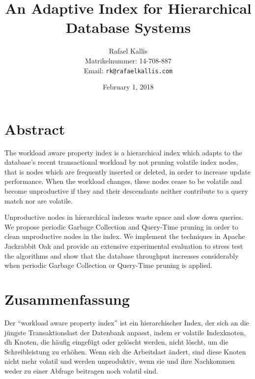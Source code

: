 \documentclass[abstracton,12pt]{scrartcl}
\title{An Adaptive Index for Hierarchical Database Systems}
\author{
    Rafael Kallis\\[-5pt]
    \scriptsize Matrikelnummer: 14-708-887\\[-5pt]
    \scriptsize Email: \texttt{rk@rafaelkallis.com}
}
\date{\vspace*{2cm}February 1, 2018}
\theoremstyle{definition}
\begin{document}
\maketitle
\thispagestyle{empty}


\newpage
\thispagestyle{empty}
\vspace*{7cm}

\section*{Abstract}

The workload aware property index is a hierarchical index which adapts to the
database's recent transactional workload by not pruning volatile index nodes,
that is nodes which are frequently inserted or deleted, in order to increase
update performance. When the workload changes, these nodes cease to be volatile
and become unproductive if they and their descendants neither contribute to a
query match nor are volatile.

Unproductive nodes in hierarchical indexes waste space and slow down queries.
We propose periodic Garbage Collection and Query-Time pruning in order to
clean unproductive nodes in the index. We implement the techniques in Apache
Jackrabbit Oak and
provide an extensive experimental evaluation to stress test the algorithms and
show that the database throughput increases considerably when periodic Garbage
Collection or Query-Time pruning is applied.

\newpage
\thispagestyle{empty}
\vspace*{7cm}

\section*{Zusammenfassung}

Der ``workload aware property index'' ist ein hierarchischer Index, der sich an
die jüngste Transaktionslast der Datenbank anpasst, indem er volatile
Indexknoten, dh Knoten, die häufig eingefügt oder gelöscht werden, nicht löscht,
um die Schreibleistung zu erhöhen. Wenn sich die Arbeitslast ändert, sind
diese Knoten nicht mehr volatil und werden unproduktiv, wenn sie und ihre
Nachkommen weder zu einer Abfrage beitragen noch volatil sind.
\end{document}
